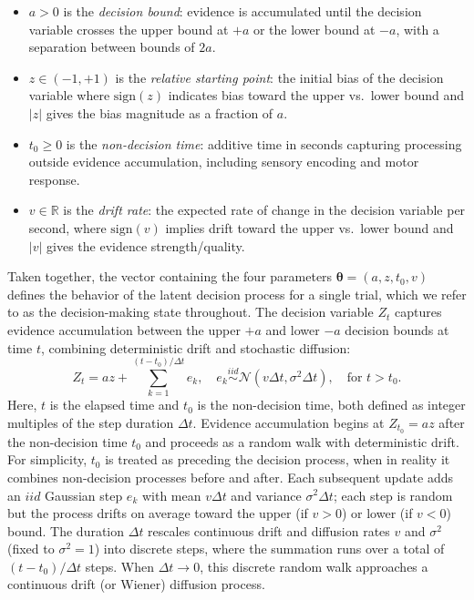 \documentclass[00-main.tex]{subfiles}
\begin{document}
\begin{itemize}
    \item $a > 0$ is the \emph{decision bound}: evidence is accumulated until the decision variable crosses the upper bound at $+a$ or the lower bound at $-a$, with a separation between bounds of $2a$.

    \item $z \in (-1, +1)$ is the \emph{relative starting point}: the initial bias of the decision variable where $\text{sign}(z)$ indicates bias toward the upper vs.\ lower bound and $|z|$ gives the bias magnitude as a fraction of $a$.

    \item $t_0 \ge 0$ is the \emph{non-decision time}: additive time in seconds capturing processing outside evidence accumulation, including sensory encoding and motor response.

    \item $v\in \mathbb{R}$ is the \emph{drift rate}: the expected rate of change in the decision variable per second, where $\text{sign}(v)$ implies drift toward the upper vs.\ lower bound and $|v|$ gives the evidence strength/quality.

\end{itemize}

Taken together, the vector containing the four parameters $\bm{\theta}=(a, z, t_0, v)$ defines the behavior of the latent decision process for a single trial, which we refer to as the decision-making state throughout. The decision variable $Z_t$ captures evidence accumulation between the upper $+a$ and lower $-a$ decision bounds at time $t$, combining deterministic drift and stochastic diffusion:
\begin{equation}\label{eq:Z_t}
Z_t = az + \sum_{k=1}^{(t - t_0)/\Delta t}e_k, \quad e_k \overset{iid}{\sim} \mathcal{N}(v\Delta t, \sigma^2\Delta t), \quad \text{for } t > t_0.
\end{equation}
Here, $t$ is the elapsed time and $t_0$ is the non-decision time, both defined as integer multiples of the step duration $\Delta t$. Evidence accumulation begins at $Z_{t_0} = az$ after the non-decision time $t_0$ and proceeds as a random walk with deterministic drift. For simplicity, $t_0$ is treated as preceding the decision process, when in reality it combines non-decision processes before and after. Each subsequent update adds an $iid$ Gaussian step $e_k$ with mean $v\Delta t$ and variance $\sigma^2\Delta t$; each step is random but the process drifts on average toward the upper (if $v>0$) or lower (if $v<0$) bound. The duration $\Delta t$ rescales continuous drift and diffusion rates $v$ and $\sigma^2$ (fixed to $\sigma^2=1$) into discrete steps, where the summation runs over a total of $(t - t_0)/\Delta t$ steps. When $\Delta t \to 0$, this discrete random walk approaches a continuous drift (or Wiener) diffusion process.
\end{document}
